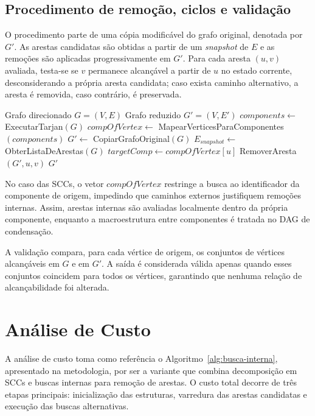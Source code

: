 \documentclass{sbc2023}%
\begin{document}
\subsection{Procedimento de remoção, ciclos e validação}

O procedimento parte de uma cópia modificável do grafo original, denotada por $G'$. As arestas candidatas são obtidas a partir de um \textit{snapshot} de $E$ e as remoções são aplicadas progressivamente em $G'$. Para cada aresta $(u,v)$ avaliada, testa-se se $v$ permanece alcançável a partir de $u$ no estado corrente, desconsiderando a própria aresta candidata; caso exista caminho alternativo, a aresta é removida, caso contrário, é preservada.

\begin{algorithm}[H]
\caption{Redução Transitiva com Busca Interna em SCCs}
\label{alg:busca-interna}
\begin{algorithmic}[1]
\Require Grafo direcionado $G=(V,E)$
\Ensure Grafo reduzido $G'=(V,E')$
\State $components \gets$ ExecutarTarjan$(G)$
\State $compOfVertex \gets$ MapearVerticesParaComponentes$(components)$
\State $G' \gets$ CopiarGrafoOriginal$(G)$
\State $E_{snapshot} \gets$ ObterListaDeArestas$(G)$
        \State $targetComp \gets compOfVertex[u]$
            \State RemoverAresta$(G', u, v)$
        \EndIf
    \EndIf
\EndFor
\State \Return $G'$
\end{algorithmic}
\end{algorithm}

No caso das SCCs, o vetor $compOfVertex$ restringe a busca ao identificador da componente de origem, impedindo que caminhos externos justifiquem remoções internas. Assim, arestas internas são avaliadas localmente dentro da própria componente, enquanto a macroestrutura entre componentes é tratada no DAG de condensação.

A validação compara, para cada vértice de origem, os conjuntos de vértices alcançáveis em $G$ e em $G'$. A saída é considerada válida apenas quando esses conjuntos coincidem para todos os vértices, garantindo que nenhuma relação de alcançabilidade foi alterada.

\section{Análise de Custo}
A análise de custo toma como referência o Algoritmo~\ref{alg:busca-interna}, apresentado na metodologia, por ser a variante que combina decomposição em SCCs e buscas internas para remoção de arestas. O custo total decorre de três etapas principais: inicialização das estruturas, varredura das arestas candidatas e execução das buscas alternativas.
\end{document}
